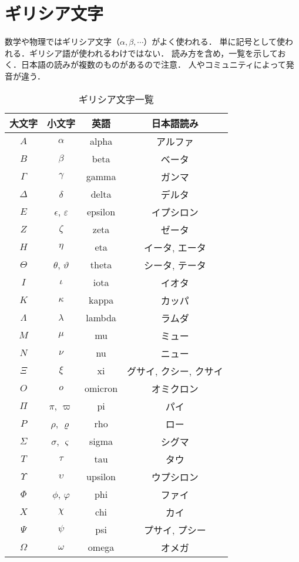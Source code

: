 \section*{ギリシア文字}
    数学や物理ではギリシア文字（$\alpha, \beta, \cdots$）がよく使われる．
    単に記号として使われる．ギリシア語が使われるわけではない．
    読み方を含め，一覧を示しておく．日本語の読みが複数のものがあるので注意．
    人やコミュニティによって発音が違う．

    \begin{table}[htbp]
        \begin{center}
            \caption{ギリシア文字一覧}
            \begin{tabular}{c|c|c|c} \hline
                大文字 & 小文字 & 英語 & 日本語読み \\ \hline
                $A$ & $\alpha$  & alpha & アルファ\\
                $B$ & $\beta$ & beta & ベータ\\
                $\Gamma$ & $\gamma$ & gamma & ガンマ\\
                $\Delta$ & $\delta$ & delta & デルタ\\
                $E$ & $\epsilon$, $\varepsilon$ & epsilon & イプシロン\\
                $Z$ & $\zeta$ & zeta & ゼータ\\
                $H$ & $\eta$ & eta & イータ, エータ\\
                $\Theta$ & $\theta$, $\vartheta$ & theta & シータ, テータ\\
                $I$ & $\iota$ & iota & イオタ\\
                $K$ & $\kappa$ & kappa & カッパ\\
                $\Lambda$& $\lambda$ & lambda & ラムダ\\
                $M$ & $\mu$ & mu & ミュー\\
                $N$ & $\nu$ & nu & ニュー\\
                $\Xi$ & $\xi$ & xi & グサイ, クシー, クサイ\\
                $O$ & $o$ & omicron & オミクロン\\
                $\Pi$ & $\pi$, $\varpi$ & pi & パイ\\
                $P$ & $\rho$, $\varrho$ & rho & ロー\\
                $\Sigma$& $\sigma$, $\varsigma$ & sigma & シグマ\\
                $T$ & $\tau$ & tau & タウ\\
                $\Upsilon$ & $\upsilon$ & upsilon& ウプシロン\\
                $\Phi$ & $\phi$, $\varphi$ & phi & ファイ\\
                $X$ & $\chi$ & chi & カイ\\
                $\Psi$ & $\psi$ & psi & プサイ, プシー\\
                $\Omega$ & $\omega$ & omega & オメガ \\ \hline
            \end{tabular}
        \label{table:greek_alphabet}
        \end{center}
    \end{table}%


